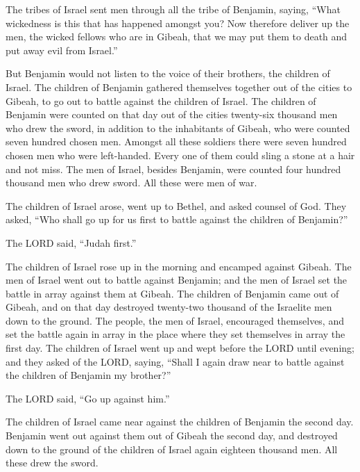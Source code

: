  The tribes of Israel sent men through all the tribe of
Benjamin, saying, ``What wickedness is this that has happened amongst
you?  Now therefore deliver up the men, the wicked
fellows who are in Gibeah, that we may put them to death and put away
evil from Israel.''

But Benjamin would not listen to the voice of their brothers, the
children of Israel.  The children of Benjamin gathered
themselves together out of the cities to Gibeah, to go out to battle
against the children of Israel.  The children of Benjamin
were counted on that day out of the cities twenty-six thousand men who
drew the sword, in addition to the inhabitants of Gibeah, who were
counted seven hundred chosen men.  Amongst all these
soldiers there were seven hundred chosen men who were left-handed. Every
one of them could sling a stone at a hair and not miss. 
The men of Israel, besides Benjamin, were counted four hundred thousand
men who drew sword. All these were men of war.

 The children of Israel arose, went up to Bethel, and
asked counsel of God. They asked, ``Who shall go up for us first to
battle against the children of Benjamin?''

The LORD said, ``Judah first.''

 The children of Israel rose up in the morning and
encamped against Gibeah.  The men of Israel went out to
battle against Benjamin; and the men of Israel set the battle in array
against them at Gibeah.  The children of Benjamin came
out of Gibeah, and on that day destroyed twenty-two thousand of the
Israelite men down to the ground.  The people, the men of
Israel, encouraged themselves, and set the battle again in array in the
place where they set themselves in array the first day. 
The children of Israel went up and wept before the LORD until evening;
and they asked of the LORD, saying, ``Shall I again draw near to battle
against the children of Benjamin my brother?''

The LORD said, ``Go up against him.''

 The children of Israel came near against the children of
Benjamin the second day.  Benjamin went out against them
out of Gibeah the second day, and destroyed down to the ground of the
children of Israel again eighteen thousand men. All these drew the
sword.

